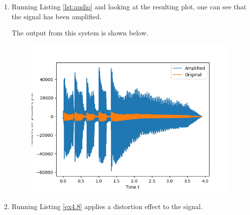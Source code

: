 \begin{enumerate}
\item Running Listing \ref{lst:audio} and looking at the resulting plot, one can see that the signal has been amplified. 

The output from this system is shown below. 
\begin{figure}
\centering
\includegraphics[scale=0.9]{ch04/figures/ex7_plot.png}
\end{figure}

\item Running Listing \ref{ex4.8} applies a distortion effect to the signal. 


\end{enumerate}
